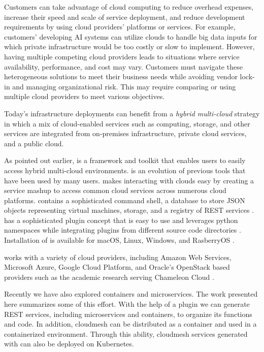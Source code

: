 Customers can take advantage of cloud computing to reduce overhead
expenses, increase their speed and scale of service deployment, and
reduce development requirements by using cloud providers' platforms or
services. For example, customers' developing AI systems can utilize
clouds to handle big data inputs for which private infrastructure would
be too costly or slow to implement. However, having multiple competing
cloud providers leads to situations where service availability,
performance, and cost may vary. Customers must navigate these
heterogeneous solutions to meet their business needs while avoiding
vendor lock-in and managing organizational risk. This may require
comparing or using multiple cloud providers to meet various objectives.

Today's infrastructure deployments can benefit from a {\em hybrid multi-cloud}
strategy in which a mix of cloud-enabled services such as computing, storage, and other services 
are integrated from on-premises infrastructure, private cloud services, and a public cloud.

As pointed out earlier,  is a framework and toolkit that enables users to
easily access hybrid multi-cloud environments. \Cloudmesh is an evolution of
previous tools that have been used by many users. \Cloudmesh makes
interacting with clouds easy by creating a service mashup to access
common cloud services across numerous cloud platforms. \Cloudmesh
contains a sophisticated command shell, a database to store JSON
objects representing virtual machines, storage, and a registry of REST
services .  \Cloudmesh has a sophisticated
plugin concept that is easy to use and leverages python namespaces
while integrating plugins from different source code
directories .  Installation of \Cloudmesh is
available for macOS, Linux, Windows, and RasberryOS
.

\Cloudmesh works with a variety of cloud providers, including Amazon Web
Services, Microsoft Azure, Google Cloud Platform, and Oracle's OpenStack
based providers such as the academic research serving Chameleon Cloud .

Recently we have also explored containers and microservices. The work presented here summarizes some of this effort. With the help of a plugin  we can generate REST services, including microservices and
containers, to organize its functions and code. In addition, cloudmesh can be distributed as a container and used in a containerized environment. Through this ability, cloudmesh services generated with  can also be deployed on Kubernetes.


